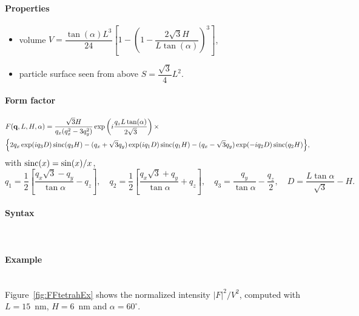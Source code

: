 \paragraph{Properties}
\begin{itemize}
\item volume $V= \dfrac{\tan(\alpha) L^3}{24} \left[1- \left(1 -
  \dfrac{2\sqrt{3} H}{L \tan(\alpha)} \right)^3\right]$,
\item particle surface seen from above $S =\dfrac{\sqrt{3}}{4}L^2$.
\end{itemize}

\paragraph{Form factor}

\begin{align*}
&F(\mathbf{q}, L, H, \alpha)=\frac{\sqrt{3}H}{q_x (q_x^2-3q_y^2)}
\exp\left(i\frac{q_z L\tan (\alpha)}{2\sqrt{3}}\right) \times \\
&\Big\{2q_x \exp(iq_3 D)\operatorname{sinc}(q_3 H) - (q_x +\sqrt{3}q_y)
\exp(iq_1 D)\operatorname{sinc}(q_1 H) -(q_x-\sqrt{3}q_y)\exp(-iq_2
D)\operatorname{sinc}(q_2 H) \Big\}, 
\end{align*}
with $\operatorname{sinc}(x)=\sin(x)/x$,
\begin{equation*}
q_1  =\frac{1}{2}\left[\frac{q_x\sqrt{3} -q_y}{\tan \alpha}-q_z \right],
\quad q_2 = \frac{1}{2}\left[\frac{q_x\sqrt{3} +q_y}{\tan \alpha}+q_z
\right], \quad 
q_3 = \frac{q_y}{\tan \alpha} -\frac{q_z}{2}, \quad D = \frac{L \tan \alpha}{\sqrt{3}} -H.
\end{equation*}

\paragraph{Syntax}\strut\\

\paragraph{Example}\strut\\
Figure~\ref{fig:FFtetrahEx} shows the normalized intensity
$|F|^2/V^2$, computed with $L=15$~nm, $H=6$~nm and $\alpha =60
^{\circ}$.

